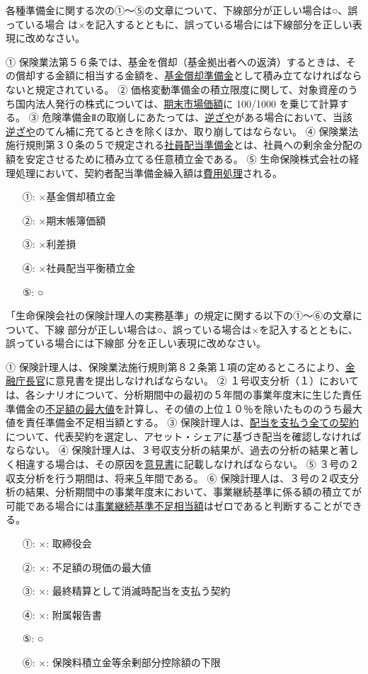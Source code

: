 \documentclass[report,gutter=10mm,fore-edge=10mm,uplatex,dvipdfmx]{jlreq}
\begin{document}

各種準備金に関する次の①～⑤の文章について、下線部分が正しい場合は○、誤っている場合
は×を記入するとともに、誤っている場合には下線部分を正しい表現に改めなさい。

① 保険業法第５６条では、基金を償却（基金拠出者への返済）するときは、その償却する金額に相当する金額を、\underline{基金償却準備金}として積み立てなければならないと規定されている。
② 価格変動準備金の積立限度に関して、対象資産のうち国内法人発行の株式については、\underline{期末市場価額}に 100/1000 を乗じて計算する。
③ 危険準備金Ⅱの取崩しにあたっては、\underline{逆ざや}がある場合において、当該\underline{逆ざや}のてん補に充てるときを除くほか、取り崩してはならない。
④ 保険業法施行規則第３０条の５で規定される\underline{社員配当準備金}とは、社員への剰余金分配の額を安定させるために積み立てる任意積立金である。
⑤ 生命保険株式会社の経理処理において、契約者配当準備金繰入額は\underline{費用処理}される。

\answer{}
\begin{itemize}
\item[ ①: ] ×基金償却積立金
\item[ ②: ] ×期末帳簿価額
\item[ ③: ] ×利差損
\item[ ④: ] ×社員配当平衡積立金
\item[ ⑤: ] ○
\end{itemize}

「生命保険会社の保険計理人の実務基準」の規定に関する以下の①～⑥の文章について、下線
部分が正しい場合は○、誤っている場合は×を記入するとともに、誤っている場合には下線部
分を正しい表現に改めなさい。

① 保険計理人は、保険業法施行規則第８２条第１項の定めるところにより、\underline{金融庁長官}に意見書を提出しなければならない。
② １号収支分析（１）においては、各シナリオについて、分析期間中の最初の５年間の事業年度末に生じた責任準備金の\underline{不足額の最大値}を計算し、その値の上位１０％を除いたもののうち最大値を責任準備金不足相当額とする。
③ 保険計理人は、\underline{配当を支払う全ての契約}について、代表契約を選定し、アセット・シェアに基づき配当を確認しなければならない。
④ 保険計理人は、３号収支分析の結果が、過去の分析の結果と著しく相違する場合は、その原因を\underline{意見書}に記載しなければならない。
⑤ ３号の２収支分析を行う期間は、将来\underline{５}年間である。
⑥ 保険計理人は、３号の２収支分析の結果、分析期間中の事業年度末において、事業継続基準に係る額の積立てが可能である場合には\underline{事業継続基準不足相当額}はゼロであると判断することができる。
\answer{}
\begin{itemize}
\item[ ①: ] ×: 取締役会
\item[ ②: ] ×: 不足額の現価の最大値
\item[ ③: ] ×: 最終精算として消滅時配当を支払う契約
\item[ ④: ] ×: 附属報告書
\item[ ⑤: ] ○ 
\item[ ⑥: ] ×: 保険料積立金等余剰部分控除額の下限
\end{itemize}
\end{document}
